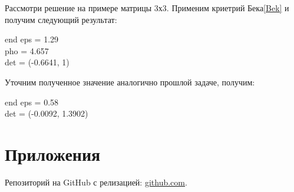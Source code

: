\documentclass[12pt,a4paper]{scrartcl}
\begin{document}
Рассмотри решение на примере матрицы 3х3. Применим криетрий Бека\ref{Bek} и получим следующий результат:
\begin{flushleft}
end eps = 1.29\\pho = 4.657\\det = (-0.6641, 1)
\end{flushleft}
Уточним полученное значение аналогично прошлой задаче, получим:
\begin{flushleft}
end eps = 0.58\\det = (-0.0092, 1.3902)
\end{flushleft}

\section{Приложения}
Репозиторий на GitHub с релизацией: \href{https://github.com/WiillyWonka/Intervals}{github.com}.
\end{document}
